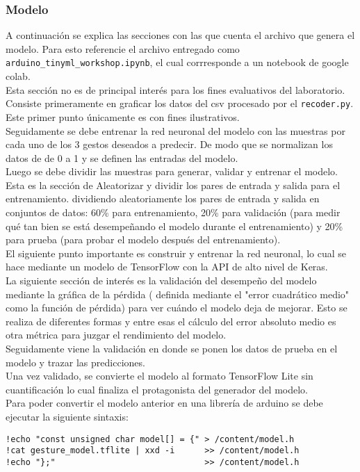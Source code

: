 \subsubsection{Modelo}
A continuación se explica las secciones con las que cuenta el archivo que genera el modelo. Para esto referencie el archivo entregado como \texttt{arduino\_tinyml\_workshop.ipynb}, el cual corrresponde a un notebook de google colab.\\
Esta sección no es de principal interés para los fines evaluativos del laboratorio. Consiste primeramente en graficar los datos del csv procesado por el \texttt{recoder.py}. Este primer punto 
únicamente es con fines ilustrativos.\\ Seguidamente se debe entrenar la red neuronal del modelo con las muestras por cada uno de los 3 gestos deseados a predecir. De modo que se normalizan los datos de de 0 a 1 y se definen las entradas del modelo.\\
Luego se debe dividir las muestras para generar, validar y entrenar el modelo. Esta es la sección de Aleatorizar y dividir los pares de entrada y salida para el entrenamiento. dividiendo aleatoriamente los pares de entrada y salida en conjuntos de datos: 60\% para entrenamiento, 20\%  para validación (para medir qué tan bien se está desempeñando el modelo durante el entrenamiento) y 20\% para prueba (para probar el modelo después del entrenamiento).\\
El siguiente punto importante es construir y entrenar la red neuronal, lo cual se hace mediante un modelo de TensorFlow con la API de alto nivel de Keras.\\
La siguiente sección de interés es la validación del desempeño del modelo mediante la gráfica de  la pérdida ( definida mediante el "error cuadrático medio" como la función de pérdida) para ver cuándo el modelo deja de mejorar. Esto se realiza de diferentes formas y entre esas el cálculo del error absoluto medio es otra métrica para juzgar el rendimiento del modelo.\\
 Seguidamente viene la validación en donde se ponen los datos de prueba en el modelo y trazar las predicciones.\\
 Una vez validado, se convierte el modelo al formato TensorFlow Lite sin cuantificación lo cual finaliza el protagonista del generador del modelo.\\
 Para poder convertir el modelo anterior en una librería de arduino se debe ejecutar la siguiente sintaxis:
 \begin{verbatim}
!echo "const unsigned char model[] = {" > /content/model.h
!cat gesture_model.tflite | xxd -i      >> /content/model.h
!echo "};"                              >> /content/model.h

 \end{verbatim}



